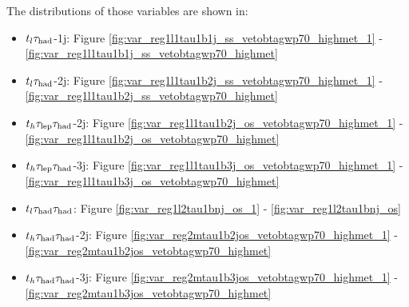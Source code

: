 \begin{enumerate}
The distributions of those variables are shown in:
\begin{itemize}
	\item $t_l\tau_\text{had}$-1j: Figure  		\ref{fig:var_reg1l1tau1b1j_ss_vetobtagwp70_highmet_1}
								-	\ref{fig:var_reg1l1tau1b1j_ss_vetobtagwp70_highmet}
	\item $t_l\tau_\text{had}$-2j: Figure  		\ref{fig:var_reg1l1tau1b2j_ss_vetobtagwp70_highmet_1}
								-	\ref{fig:var_reg1l1tau1b2j_ss_vetobtagwp70_highmet}
	\item $t_h\tau_\text{lep}{}\tau_\text{had}$-2j: Figure 		\ref{fig:var_reg1l1tau1b2j_os_vetobtagwp70_highmet_1}
							 	-	\ref{fig:var_reg1l1tau1b2j_os_vetobtagwp70_highmet}
	\item $t_h\tau_\text{lep}{}\tau_\text{had}$-3j: Figure 		\ref{fig:var_reg1l1tau1b3j_os_vetobtagwp70_highmet_1}
								-	\ref{fig:var_reg1l1tau1b3j_os_vetobtagwp70_highmet}
	\item $t_l\tau_\text{had}{}\tau_\text{had}$: Figure 		\ref{fig:var_reg1l2tau1bnj_os_1}
								-	\ref{fig:var_reg1l2tau1bnj_os}
	\item $t_h\tau_\text{had}{}\tau_\text{had}$-2j: Figure 	\ref{fig:var_reg2mtau1b2jos_vetobtagwp70_highmet_1}
								-	\ref{fig:var_reg2mtau1b2jos_vetobtagwp70_highmet}
	\item $t_h\tau_\text{had}{}\tau_\text{had}$-3j: Figure 	\ref{fig:var_reg2mtau1b3jos_vetobtagwp70_highmet_1}
								-	\ref{fig:var_reg2mtau1b3jos_vetobtagwp70_highmet}
\end{itemize}









\end{enumerate}
